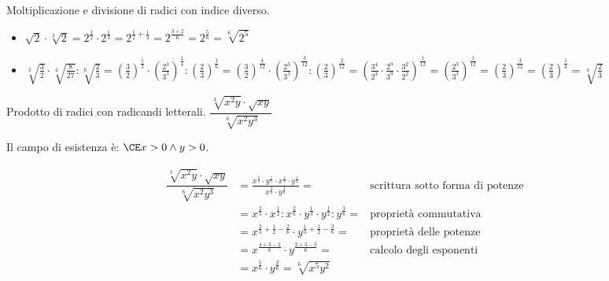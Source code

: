 \begin{exrig}
 \begin{esempio}
Moltiplicazione e divisione di radici con indice diverso.
\begin{itemize}
\item $\sqrt 2\cdot \sqrt[3]2=
       2^\frac{1}{2} \cdot 2^\frac{1}{3} = 2^{\frac{1}{2} + \frac{1}{3}} =
       2^{\frac{3+2}{6}} = 2^{\frac{5}{6}} =\sqrt[6]{2^5}$
\item 
  $\sqrt[3]{\frac{3}{2}} \cdot \sqrt[4]{\frac{8}{27}} : \sqrt[6]{\frac{2}{3}}=
   \left(\frac{3}{2}\right)^{\frac{1}{3}} \cdot 
   \left(\frac{2^3}{3^3}\right)^{\frac{1}{4}} : 
   \left(\frac{2}{3}\right)^{\frac{1}{6}}=
   \left(\frac{3}{2}\right)^{\frac{4}{12}} \cdot 
   \left(\frac{2^3}{3^3}\right)^{\frac{3}{12}} : 
   \left(\frac{2}{3}\right)^{\frac{2}{12}}=
   \left(\frac{3^4}{2^4} \cdot 
   \frac{2^9}{3^9} \cdot 
   \frac{3^2}{2^2}\right)^{\frac{1}{12}}=
   \left(\frac{2^3}{3^3}\right)^{\frac{1}{12}}=
   \left(\frac{2}{3}\right)^{\frac{3}{12}}=
   \left(\frac{2}{3}\right)^{\frac{1}{4}}=\sqrt[4]{\frac 2 3}$
\end{itemize}
 \end{esempio}

\begin{esempio}
Prodotto di radici con radicandi letterali.
 $\dfrac{\sqrt[3]{x^2y}\cdot \sqrt{xy}}{\sqrt[6]{x^2y^3}}$
 
 Il campo di esistenza è: $\CE x>0\wedge y>0$.
 
\begin{align*}
\dfrac{\sqrt[3]{x^2y}\cdot \sqrt{xy}}{\sqrt[6]{x^2y^3}} &=
\frac{{x^\frac{2}{3} \cdot y^\frac{1}{3}} \cdot 
       x^\frac{1}{2} \cdot y^\frac{1}{2}}
     {x^\frac{2}{6} \cdot y^\frac{3}{6}} =
         & \mbox{scrittura sotto forma di potenze}\\
    &=x^\frac{2}{3} \cdot x^\frac{1}{2} : x^\frac{2}{6} \cdot 
      y^\frac{1}{3} \cdot y^\frac{1}{2} : y^\frac{3}{6}=
         & \mbox{proprietà commutativa} \\
    &=x^{\frac{2}{3} + \frac{1}{2} - \frac{2}{6}} \cdot 
      y^{\frac{1}{3} + \frac{1}{2} - \frac{3}{6}}= 
         & \mbox{proprietà delle potenze}\\
    &=x^{\frac{4+3-2}{6}} \cdot y^{\frac{2+3-3}{6}}=
         & \mbox{calcolo degli esponenti} \\
    &=x^{\frac{5}{6}} \cdot y^{\frac{2}{6}}=
    \sqrt[6]{x^5y^2}
\end{align*}

\end{esempio}


\end{exrig}
